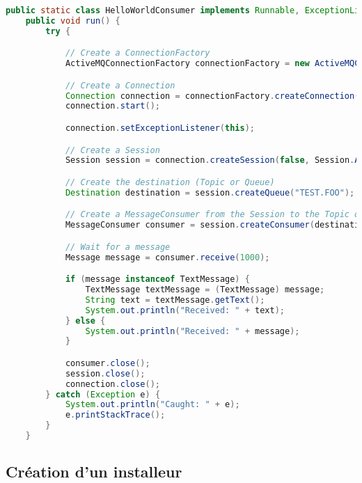 \begin{minipage}{\linewidth}
\begin{lstlisting}[language=Java, caption="Un exemple écourté d'échange de messages \textit{via} ActiveMQ", label={lst:activemq_ex}]
public static class HelloWorldConsumer implements Runnable, ExceptionListener {
    public void run() {
        try {

            // Create a ConnectionFactory
            ActiveMQConnectionFactory connectionFactory = new ActiveMQConnectionFactory("vm://localhost");

            // Create a Connection
            Connection connection = connectionFactory.createConnection();
            connection.start();

            connection.setExceptionListener(this);

            // Create a Session
            Session session = connection.createSession(false, Session.AUTO_ACKNOWLEDGE);

            // Create the destination (Topic or Queue)
            Destination destination = session.createQueue("TEST.FOO");

            // Create a MessageConsumer from the Session to the Topic or Queue
            MessageConsumer consumer = session.createConsumer(destination);

            // Wait for a message
            Message message = consumer.receive(1000);

            if (message instanceof TextMessage) {
                TextMessage textMessage = (TextMessage) message;
                String text = textMessage.getText();
                System.out.println("Received: " + text);
            } else {
                System.out.println("Received: " + message);
            }

            consumer.close();
            session.close();
            connection.close();
        } catch (Exception e) {
            System.out.println("Caught: " + e);
            e.printStackTrace();
        }
    }
\end{lstlisting}
\end{minipage}

\subsection{Création d'un installeur}